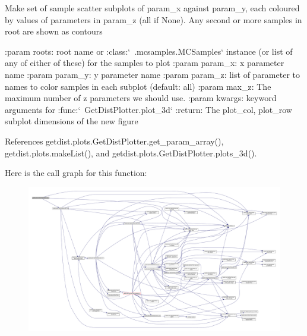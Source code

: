 \begin{DoxyVerb}Make set of sample scatter subplots of param_x against param_y, each coloured by values of parameters in param_z (all if None).
Any second or more samples in root are shown as contours

:param roots: root name or :class:`~.mcsamples.MCSamples` instance (or list of any of either of these) for the samples to plot
:param param_x: x parameter name
:param param_y: y parameter name
:param param_z: list of parameter to names to color samples in each subplot (default: all)
:param max_z: The maximum number of z parameters we should use.
:param kwargs: keyword arguments for :func:`~GetDistPlotter.plot_3d`
:return: The plot_col, plot_row subplot dimensions of the new figure
\end{DoxyVerb}
 

References getdist.\+plots.\+Get\+Dist\+Plotter.\+get\+\_\+param\+\_\+array(), getdist.\+plots.\+make\+List(), and getdist.\+plots.\+Get\+Dist\+Plotter.\+plots\+\_\+3d().

Here is the call graph for this function\+:
\nopagebreak
\begin{figure}[H]
\begin{center}
\leavevmode
\includegraphics[width=350pt]{classgetdist_1_1plots_1_1GetDistPlotter_ad8246050feeaf02dc737682fc5b41292_cgraph}
\end{center}
\end{figure}
\mbox{\label{classgetdist_1_1plots_1_1GetDistPlotter_a814e233ab36c48c3a3a34d4c837d4251}} 
